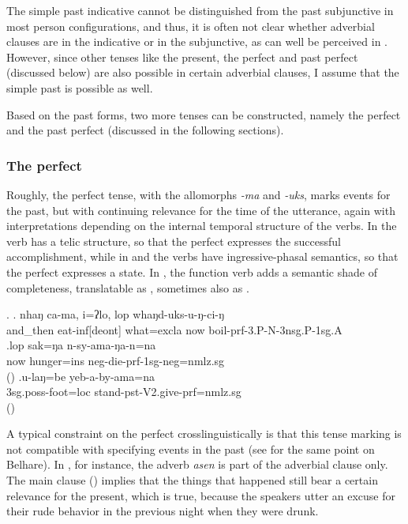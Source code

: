 The simple past indicative cannot be distinguished from the past subjunctive in most person configurations, and thus, it is often not clear whether adverbial clauses are in the indicative or in the subjunctive, as can well be perceived in \LLast. However, since other tenses like the present, the perfect and past perfect (discussed below) are also possible in certain adverbial clauses, I assume that the simple past is possible as well. 

Based on the past forms, two more tenses can be constructed, namely the perfect and the past perfect (discussed in the following sections). 

\subsubsection{The perfect}\label{prf}

Roughly, the perfect tense, with the allomorphs \emph{-ma} and \emph{-uks}, marks events for the past, but with continuing relevance for  the time of the utterance, again with interpretations depending on the internal temporal structure of the verbs. In \Next[a] the verb has a telic structure, so that the perfect expresses the successful accomplishment, while in \Next[b] and \Next[c] the verbs have ingressive-phasal semantics, so that the perfect expresses a state. In \Next[c], the function verb  adds a semantic shade of completeness, translatable as , sometimes also as .

\ex. \ag. nhaŋ    ca-ma,     i=ʔlo,   lop whaŋd-uks-u-ŋ-ci-ŋ\\
		and\_then eat{\sc -inf[deont]} what{\sc =excla} now boil{\sc -prf-3.P-N-3nsg.P-1sg.A}\\
		 
		\bg.lop sak=ŋa n-sy-ama-ŋa-n=na\\
now hunger{\sc =ins} {\sc neg-}die{\sc -prf-1sg-neg=nmlz.sg}\\
		 ()
	\bg.u-laŋ=be yeb-a-by-ama=na\\
	{\sc 3sg.poss-}foot{\sc =loc} stand{\sc [3sg]-pst-V2.give-prf=nmlz.sg}\\
	 ()
	
A typical constraint on the perfect crosslinguistically is that this tense marking is not compatible with specifying events in the past (see \citep[176]{Bickel1996Aspect} for the same point on Belhare). In \Next, for instance, the adverb \emph{asen} is part of the adverbial clause only. The main clause () implies that the things that happened still bear a certain relevance for the present, which is true, because the speakers utter an excuse for their rude behavior in the previous night when they were drunk.

